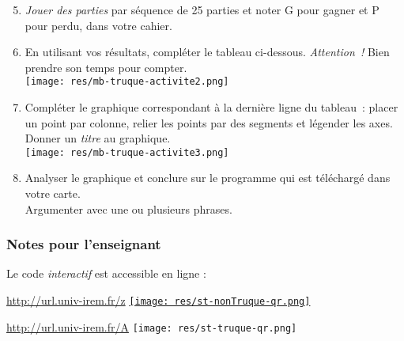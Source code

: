 \begin{eleve}
    \begin{enumerate}
        \setcounter{enumi}{4}
        \item \emph{Jouer des parties} par séquence de 25 parties et noter G pour gagner et P pour perdu, dans votre cahier.
        \item En utilisant vos résultats, compléter le tableau ci-dessous. \emph{Attention !} Bien prendre son temps pour compter.\\
        \texttt{[image: res/mb-truque-activite2.png]}
        \item Compléter le graphique correspondant à la dernière ligne du tableau : placer un point par colonne, relier les points par des segments et légender les axes.\\
        Donner un \emph{titre} au graphique.\\
          \texttt{[image: res/mb-truque-activite3.png]}
        \item Analyser le graphique et conclure sur le programme qui est téléchargé dans votre carte.\\
        Argumenter avec une ou plusieurs phrases.
    \end{enumerate}
    
\end{eleve}



\subsubsection{Notes pour l'enseignant}

\begin{remarque}
    Le code \emph{interactif} est accessible en ligne :
	
	\url{http://url.univ-irem.fr/z}\quad
	\href{http://url.univ-irem.fr/z}{\texttt{[image: res/st-nonTruque-qr.png]}} \par
	\url{http://url.univ-irem.fr/A}\quad
	\texttt{[image: res/st-truque-qr.png]}
	

\end{remarque}